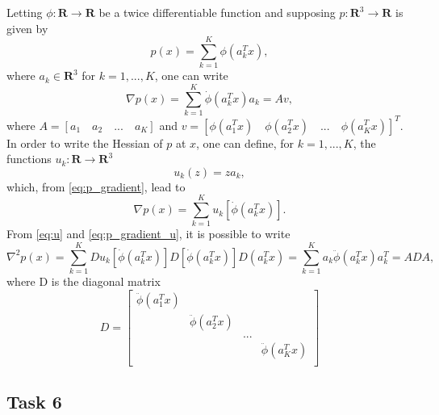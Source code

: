\documentclass[12pt]{article}
\begin{document}
Letting $\phi: \mathbf{R} \rightarrow \mathbf{R}$ be a twice differentiable function and supposing $p: \mathbf{R}^3 \rightarrow \mathbf{R}$ is given by
\begin{equation} \label{eq:p}
    p(x) = \sum^K_{k=1} \phi \left(a_k^T x\right),
\end{equation}
where $a_k \in \mathbf{R}^3$ for $k = 1, ..., K$, one can write
\begin{equation} \label{eq:p_gradient}
    \nabla p (x) = \sum_{k=1}^K \dot{\phi}(a_k^T x) a_k = A v,
\end{equation}
where $A = [a_1 \quad a_2 \quad ... \quad a_K]$ and $v = [\phi(a_1^T x) \quad \phi(a_2^T x) \quad ... \quad \phi(a_K^T x)]^T$. In order to write the Hessian of $p$ at $x$, one can define, for $k=1,...,K$, the functions $u_k: \mathbf{R} \rightarrow \mathbf{R}^3$
\begin{equation} \label{eq:u}
    u_k(z) = z a_k,
\end{equation}
which, from \eqref{eq:p_gradient}, lead to
\begin{equation} \label{eq:p_gradient_u}
    \nabla p (x) = \sum_{k=1}^K u_k \left [\dot{\phi}(a_k^T x)\right].
\end{equation}
From \eqref{eq:u} and \eqref{eq:p_gradient_u}, it is possible to write
\begin{equation} \label{eq:p_hessian}
    \nabla^2 p(x) = \sum_{k=1}^K D u_k \left [\dot{\phi}(a_k^T x)\right] D \left [\dot{\phi}(a_k^T x) \right] D(a_k^T x) = \sum_{k=1}^K a_k \ddot{\phi}(a_k^T x) a_k^T = A D A,
\end{equation}
where D is the diagonal matrix
\begin{equation} \label{eq:p_hessian_D}
    D = 
    \begin{bmatrix}
    \ddot{\phi}(a_1^T x) &&& \\
    & \ddot{\phi}(a_2^T x) && \\
    &&...&\\
    &&& \ddot{\phi}(a_K^T x) \\
    \end{bmatrix}
\end{equation}

\subsection{Task 6}
\end{document}
